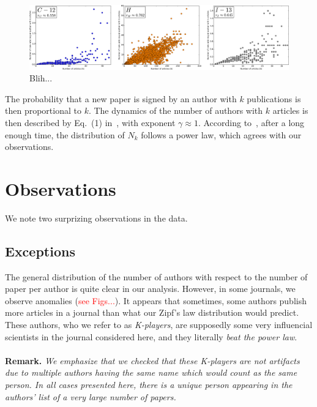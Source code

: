 \documentclass[aps,prl,floatfix,twocolumn]{revtex4-1}
\begin{document}
\begin{figure}
 \centering
 \includegraphics[width=\textwidth]{figures/CHI_correl.pdf}
 \caption{Blih...}
 \label{fig:2}
\end{figure}


The probability that a new paper is signed by an author with $k$ publications is then proportional to $k$. 
The dynamics of the number of authors with $k$ articles is then described by Eq.~(1) in~\cite{Kra00}, with exponent $\gamma\approx 1$. 
According to~\cite{Kra00}, after a long enough time, the distribution of $N_k$ follows a power law, which agrees with our observations.


\section{Observations}
We note two surprizing observations in the data. 

\subsection{Exceptions }
The general distribution of the number of authors with respect to the number of paper per author is quite clear in our analysis. 
However, in some journals, we observe anomalies (\textcolor{red}{see Figs...}). 
It appears that sometimes, some authors publish more articles in a journal than what our Zipf's law distribution would predict. 
These authors, who we refer to as \emph{K-players}, are supposedly some very influencial scientists in the journal considered here, and they literally \emph{beat the power law}.

\paragraph{}
{\bf Remark.}\textit{
We emphasize that we checked that these K-players are not artifacts due to multiple authors having the same name which would count as the same person. 
In all cases presented here, there is a unique person appearing in the authors' list of a very large number of papers. 
}
\end{document}
